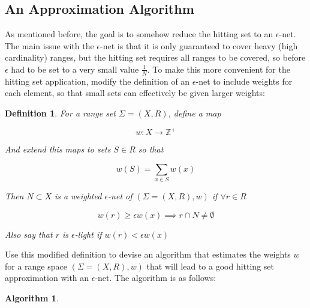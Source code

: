 \documentclass[11pt]{article}
\newtheorem{definition}{Definition}
\newtheorem{algorithm}{Algorithm}
\begin{document}
\subsection{An Approximation Algorithm}

As mentioned before, the goal is to somehow reduce the hitting set to an $\epsilon$-net.  The main issue with the $\epsilon$-net is that it is only guaranteed to cover heavy (high cardinality) ranges, but the hitting set requires all ranges to be covered, so before $\epsilon$ had to be set to a very small value $\frac{1}{N}$.  To make this more convenient for the hitting set application, modify the definition of an $\epsilon$-net to include weights for each element, so that small sets can effectively be given larger weights:

\begin{definition}

For a range set $\Sigma = (X, R)$, define a map 

\[w: X \rightarrow \mathbb{Z}^+\]

And extend this maps to sets $S \in R$ so that

\[ w(S) = \sum_{x \in S} w(x) \]

Then $N \subset X$ is a {\em weighted $\epsilon$-net of $(\Sigma = (X, R), w)$} if $\forall r \in R$

\[ w(r) \geq \epsilon w(x) \implies r \cap N \neq \emptyset \]

Also say that $r$ is {\em $\epsilon$-light} if $w(r) < \epsilon w(x)$

\end{definition}

Use this modified definition to devise an algorithm that estimates the weights $w$ for a range space $(\Sigma = (X, R), w)$ that will lead to a good hitting set approximation with an $\epsilon$-net.  The algorithm is as follows:

\begin{algorithm}
\label{alg:estimateweights}
\end{algorithm}
\end{document}
